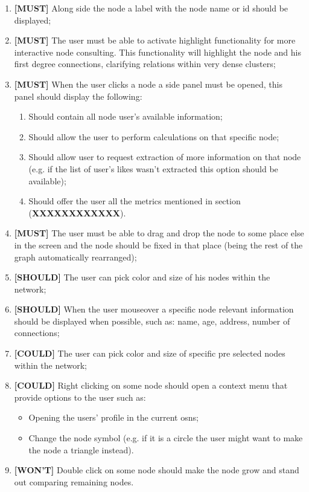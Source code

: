 \begin{enumerate}
    \item \textbf{[MUST]} Along side the node a label with the node name or id should be displayed;
    \item \textbf{[MUST]} The user must be able to activate highlight functionality for more interactive node consulting. This functionality will highlight the node
    and his first degree connections, clarifying relations within very dense clusters; %
    \item \textbf{[MUST]} When the user clicks a node a side panel must be opened, this panel should display the following:
    \begin{enumerate}
        \item Should contain all node user's available information;
        \item Should allow the user to perform calculations on that specific node;
        \item Should allow user to request extraction of more information on that node (e.g. if the list of user's likes wasn't extracted this option should be available);
        \item Should offer the user all the metrics mentioned in section (\textbf{XXXXXXXXXXXX}).
    \end{enumerate}
    \item \textbf{[MUST]} The user must be able to drag and drop the node to some place else in the screen and the node should be fixed in that place (being the rest of the graph automatically rearranged); %
    \item \textbf{[SHOULD]} The user can pick color and size of his nodes within the network;
    \item \textbf{[SHOULD]} When the user mouseover a specific node relevant information should be displayed when possible, such as: name, age, address, number of connections;
    \item \textbf{[COULD]} The user can pick color and size of specific pre selected nodes within the network;
    \item \textbf{[COULD]} Right clicking on some node should open a context menu that provide options to the user such as:
    \begin{itemize}
        \item Opening the users' profile in the current \glspl{osn};
        \item Change the node symbol (e.g. if it is a circle the user might want to make the node a triangle instead). %
    \end{itemize}
    \item \textbf{[WON'T]} Double click on some node should make the node grow and stand out comparing remaining nodes. %
\end{enumerate}

